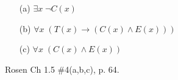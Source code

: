 \documentclass[12pt,addpoints]{exam}
\newcommand{\ra}{\rightarrow}
\begin{document}
\begin{questions}
    \begin{solution}
    \begin{itemize}
        \item[(a)] $\exists x\; \neg C(x) $
        \item[(b)] $\forall x\; (T(x) \ra (C(x) \wedge E(x))) $
        \item[(c)] $\forall x\; (C(x) \wedge E(x)) $
    \end{itemize}
    \end{solution}


\question[6] Rosen Ch 1.5 \#4(a,b,c), p. 64.
    \begin{solution}
    \begin{itemize}

\end{itemize}
\end{solution}
\end{questions}
\end{document}
